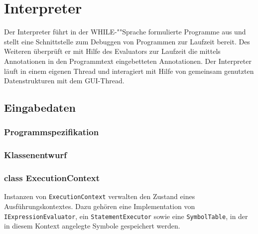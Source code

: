 \section{Interpreter}

Der Interpreter führt in der WHILE-""Sprache formulierte Programme aus und stellt eine Schnittstelle zum Debuggen von Programmen zur Laufzeit bereit. Des Weiteren überprüft er mit Hilfe des Evaluators zur Laufzeit die mittels Annotationen in den Programmtext eingebetteten Annotationen. Der Interpreter läuft in einem eigenen Thread und interagiert mit Hilfe von gemeinsam genutzten Datenstrukturen mit dem GUI-Thread.

\subsection{Eingabedaten}

\subsubsection{Programmspezifikation}


\subsubsection{Klassenentwurf}

\subsubsection{class ExecutionContext}
Instanzen von \texttt{ExecutionContext} verwalten den Zustand eines Ausführungskontextes. Dazu gehören eine Implementation von \texttt{IExpressionEvaluator}, ein \texttt{StatementExecutor} sowie eine \texttt{SymbolTable}, in der in diesem Kontext angelegte Symbole gespeichert werden.


